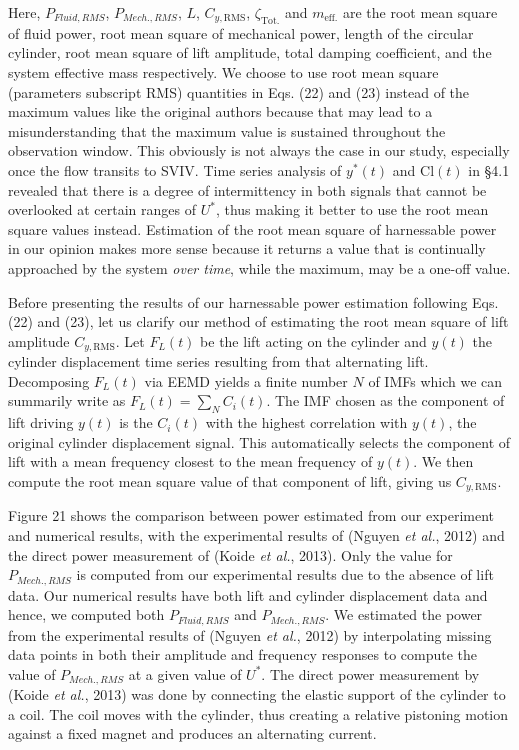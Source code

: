 \documentclass[]{article}
\begin{document}
Here, \(P_{Fluid,RMS}\), \(P_{Mech.,RMS}\), \(L\), \(C_{y,\text{RMS}}\),
\(\zeta_{\text{Tot.}}\) and \(m_{\text{eff.}}\) are the root mean square
of fluid power, root mean square of mechanical power, length of the
circular cylinder, root mean square of lift amplitude, total damping
coefficient, and the system effective mass respectively. We choose to
use root mean square (parameters subscript RMS) quantities in Eqs. (22)
and (23) instead of the maximum values like the original authors because
that may lead to a misunderstanding that the maximum value is sustained
throughout the observation window. This obviously is not always the case
in our study, especially once the flow transits to SVIV. Time series
analysis of \(y^{*}\left( t \right)\) and \(\text{Cl}\left( t \right)\)
in §\protect\hypertarget{currentWorkingPosition}{}{}4.1 revealed that
there is a degree of intermittency in both signals that cannot be
overlooked at certain ranges of \(U^{*}\), thus making it better to use
the root mean square values instead. Estimation of the root mean square
of harnessable power in our opinion makes more sense because it returns
a value that is continually approached by the system \emph{over time},
while the maximum, may be a one-off value.

Before presenting the results of our harnessable power estimation
following Eqs. (22) and (23), let us clarify our method of estimating
the root mean square of lift amplitude \(C_{y,\text{RMS}}\). Let
\(F_{L}\left( t \right)\) be the lift acting on the cylinder and
\(y\left( t \right)\) the cylinder displacement time series resulting
from that alternating lift. Decomposing \(F_{L}\left( t \right)\) via
EEMD yields a finite number \(N\) of IMFs which we can summarily write
as \(F_{L}\left( t \right) = \sum_{N}^{}{C_{i}\left( t \right)}\). The
IMF chosen as the component of lift driving \(y\left( t \right)\) is the
\(C_{i}\left( t \right)\) with the highest correlation with
\(y\left( t \right)\), the original cylinder displacement signal. This
automatically selects the component of lift with a mean frequency
closest to the mean frequency of \(y\left( t \right)\). We then compute
the root mean square value of that component of lift, giving us
\(C_{y,\text{RMS}}\).

Figure 21 shows the comparison between power estimated from our
experiment and numerical results, with the experimental results of
(Nguyen \emph{et al.}, 2012) and the direct power measurement of (Koide
\emph{et al.}, 2013). Only the value for \(P_{Mech.,RMS}\) is computed
from our experimental results due to the absence of lift data. Our
numerical results have both lift and cylinder displacement data and
hence, we computed both \(P_{Fluid,RMS}\) and \(P_{Mech.,RMS}\). We
estimated the power from the experimental results of (Nguyen \emph{et
al.}, 2012) by interpolating missing data points in both their amplitude
and frequency responses to compute the value of \(P_{Mech.,RMS}\) at a
given value of \(U^{*}\). The direct power measurement by (Koide
\emph{et al.}, 2013) was done by connecting the elastic support of the
cylinder to a coil. The coil moves with the cylinder, thus creating a
relative pistoning motion against a fixed magnet and produces an
alternating current.
\end{document}
